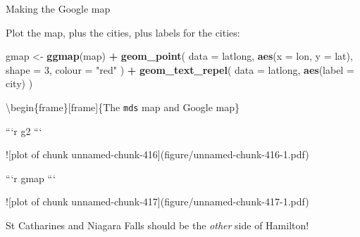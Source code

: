 \documentclass[ignorenonframetext,]{beamer}
\newenvironment{Shaded}{\begin{snugshade}}{\end{snugshade}}
\newcommand{\DataTypeTok}[1]{\textcolor[rgb]{0.13,0.29,0.53}{#1}}
\newcommand{\DecValTok}[1]{\textcolor[rgb]{0.00,0.00,0.81}{#1}}
\newcommand{\KeywordTok}[1]{\textcolor[rgb]{0.13,0.29,0.53}{\textbf{#1}}}
\newcommand{\NormalTok}[1]{#1}
\newcommand{\OperatorTok}[1]{\textcolor[rgb]{0.81,0.36,0.00}{\textbf{#1}}}
\newcommand{\StringTok}[1]{\textcolor[rgb]{0.31,0.60,0.02}{#1}}
\begin{document}
\begin{frame}[fragile]{Making the Google map}
\protect\hypertarget{making-the-google-map}{}

Plot the map, plus the cities, plus labels for the cities:

\begin{Shaded}
\begin{Highlighting}[]
\NormalTok{gmap <-}\StringTok{ }\KeywordTok{ggmap}\NormalTok{(map) }\OperatorTok{+}
\StringTok{  }\KeywordTok{geom_point}\NormalTok{(}
    \DataTypeTok{data =}\NormalTok{ latlong,}
    \KeywordTok{aes}\NormalTok{(}\DataTypeTok{x =}\NormalTok{ lon, }\DataTypeTok{y =}\NormalTok{ lat),}
    \DataTypeTok{shape =} \DecValTok{3}\NormalTok{, }\DataTypeTok{colour =} \StringTok{"red"}
\NormalTok{  ) }\OperatorTok{+}
\StringTok{  }\KeywordTok{geom_text_repel}\NormalTok{(}
    \DataTypeTok{data =}\NormalTok{ latlong,}
    \KeywordTok{aes}\NormalTok{(}\DataTypeTok{label =}\NormalTok{ city)}
\NormalTok{  )}
\end{Highlighting}
\end{Shaded}

\textbackslash{}begin\{frame\}{[}frame{]}\{The \texttt{mds} map and
Google map\}

\begin{multicols}{2}

```r
g2
```

![plot of chunk unnamed-chunk-416](figure/unnamed-chunk-416-1.pdf)

     


```r
gmap
```

![plot of chunk unnamed-chunk-417](figure/unnamed-chunk-417-1.pdf)

 
\end{multicols}

St Catharines and Niagara Falls should be the \emph{other} side of
Hamilton!

\end{frame}
\end{document}
